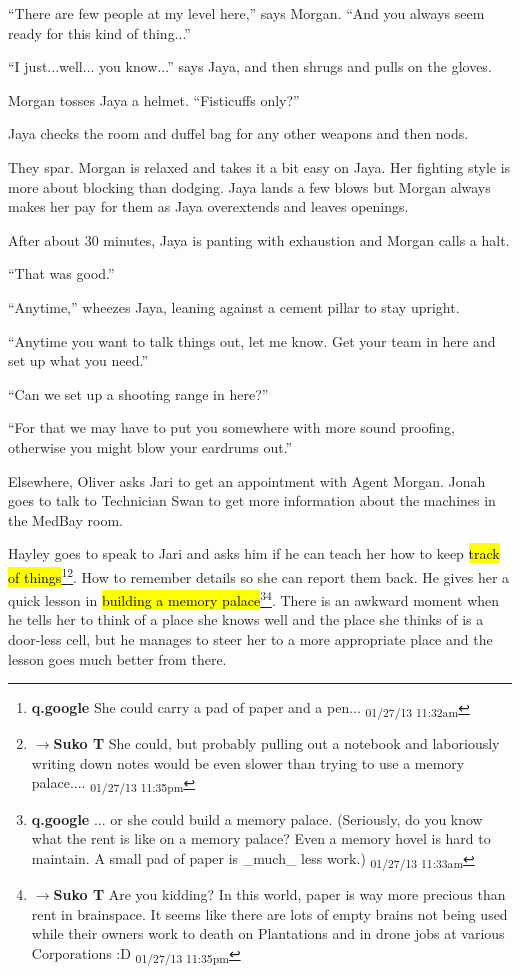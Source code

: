 ``There are few people at my level here,'' says Morgan.  ``And you always seem ready for this kind of thing...''

``I just...well... you know...'' says Jaya, and then shrugs and pulls on the gloves.

Morgan tosses Jaya a helmet.  ``Fisticuffs only?''

Jaya checks the room and duffel bag for any other weapons and then nods.



They spar.  Morgan is relaxed and takes it a bit easy on Jaya.  Her fighting style is more about blocking than dodging.  Jaya lands a few blows but Morgan always makes her pay for them as Jaya overextends and leaves openings.



After about 30 minutes, Jaya is panting with exhaustion and Morgan calls a halt.

``That was good.''

``Anytime,'' wheezes Jaya, leaning against a cement pillar to stay upright.

``Anytime you want to talk things out, let me know.  Get your team in here and set up what you need.''

``Can we set up a shooting range in here?''

``For that we may have to put you somewhere with more sound proofing, otherwise you might blow your eardrums out.''



Elsewhere, Oliver asks Jari to get an appointment with Agent Morgan.   Jonah goes to talk to Technician Swan to get more information about the machines in the MedBay room. 



Hayley goes to speak to Jari and asks him if he can teach her how to keep \hl{track of things}\footnote{\textbf{q.google }She could carry a pad of paper and a pen... \textsubscript{01/27/13 11:32am}}\footnote{$\rightarrow$\textbf{Suko T }She could, but probably pulling out a notebook and laboriously writing down notes would be even slower than trying to use a memory palace.... \textsubscript{01/27/13 11:35pm}}.  How to remember details so she can report them back. He gives her a quick lesson in \hl{building a memory palace}\footnote{\textbf{q.google }... or she could build a memory palace.
(Seriously, do you know what the rent is like on a memory palace?  Even a memory hovel is hard to maintain.  A small pad of paper is \_much\_ less work.) \textsubscript{01/27/13 11:33am}}\footnote{$\rightarrow$\textbf{Suko T }Are you kidding?  In this world, paper is way more precious than rent in brainspace.  It seems like there are lots of empty brains not being used while their owners work to death on Plantations and in drone jobs at various Corporations :D \textsubscript{01/27/13 11:35pm}}.  There is an awkward moment when he tells her to think of a place she knows well and the place she thinks of is a door-less cell, but he manages to steer her to a more appropriate place and the lesson goes much better from there.


